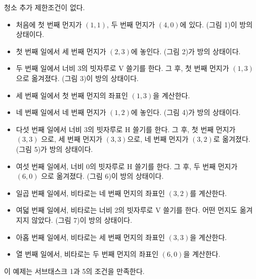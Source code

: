 \begin{problem}{청소}
	추가 제한조건이 없다.
		
	\Examples
		
	\begin{example}
\end{example}

	\begin{itemize}
		\item 처음에 첫 번째 먼지가 $(1, 1)$, 두 번째 먼지가 $(4, 0)$에 있다. (그림 1)이 방의 상태이다.
		\item 첫 번째 일에서 세 번째 먼지가 $(2, 3)$에 놓인다. (그림 2)가 방의 상태이다.
		\item 두 번째 일에서 너비 3의 빗자루로 V 쓸기를 한다. 그 후, 첫 번째 먼지가 $(1, 3)$ 으로 옮겨졌다. (그림 3)이 방의 상태이다.
		\item 세 번째 일에서 첫 번째 먼지의 좌표인 $(1, 3)$을 계산한다.
		\item 네 번째 일에서 네 번째 먼지가 $(1, 2)$에 놓인다. (그림 4)가 방의 상태이다.
		\item 다섯 번째 일에서 너비 3의 빗자루로 H 쓸기를 한다. 그 후, 첫 번째 먼지가 $(3, 3)$ 으로, 세 번째 먼지가 $(3, 3)$으로, 네 번째 먼지가 $(3, 2)$로 옮겨졌다. (그림 5)가 방의 상태이다.
		\item 여섯 번째 일에서, 너비 0의 빗자루로 H 쓸기를 한다. 그 후, 두 번째 먼지가 $(6, 0)$ 으로 옮겨졌다. (그림 6)이 방의 상태이다.
		\item 일곱 번째 일에서, 비타로는 네 번째 먼지의 좌표인 $(3, 2)$를 계산한다.
		\item 여덟 번째 일에서, 비타로는 너비 2의 빗자루로 V 쓸기를 한다. 어떤 먼지도 옮겨지지 않았다. (그림 7)이 방의 상태이다.
		\item 아홉 번째 일에서, 비타로는 세 번째 먼지의 좌표인 $(3, 3)$을 계산한다.
		\item 열 번째 일에서, 비타로는 두 번째 먼지의 좌표인 $(6, 0)$을 계산한다.
	\end{itemize}

	이 예제는 서브태스크 1과 5의 조건을 만족한다.


\end{problem}
